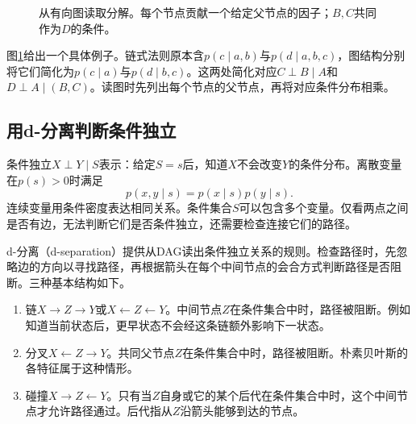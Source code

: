 \begin{figure}[htbp]
\centering
{}
\caption{从有向图读取分解。每个节点贡献一个给定父节点的因子；$B,C$共同作为$D$的条件。}
\label{fig:bayes-dag-factorization}
\end{figure}

图\ref{fig:bayes-dag-factorization}给出一个具体例子。链式法则原本含$p(c\mid a,b)$与$p(d\mid a,b,c)$，图结构分别将它们简化为$p(c\mid a)$与$p(d\mid b,c)$。这两处简化对应$C\perp B\mid A$和$D\perp A\mid(B,C)$。读图时先列出每个节点的父节点，再将对应条件分布相乘。

\subsection{用d-分离判断条件独立}
条件独立$X\perp Y\mid S$表示：给定$S=s$后，知道$X$不会改变$Y$的条件分布。离散变量在$p(s)>0$时满足
\begin{equation}
 p(x,y\mid s)=p(x\mid s)p(y\mid s).
\end{equation}
连续变量用条件密度表达相同关系。条件集合$S$可以包含多个变量。仅看两点之间是否有边，无法判断它们是否条件独立，还需要检查连接它们的路径。

d-分离（d-separation）提供从DAG读出条件独立关系的规则。检查路径时，先忽略边的方向以寻找路径，再根据箭头在每个中间节点的会合方式判断路径是否阻断。三种基本结构如下。
\begin{enumerate}
 \item 链$X\to Z\to Y$或$X\leftarrow Z\leftarrow Y$。中间节点$Z$在条件集合中时，路径被阻断。例如知道当前状态后，更早状态不会经这条链额外影响下一状态。
 \item 分叉$X\leftarrow Z\to Y$。共同父节点$Z$在条件集合中时，路径被阻断。朴素贝叶斯的各特征属于这种情形。
 \item 碰撞$X\to Z\leftarrow Y$。只有当$Z$自身或它的某个后代在条件集合中时，这个中间节点才允许路径通过。后代指从$Z$沿箭头能够到达的节点。
\end{enumerate}

